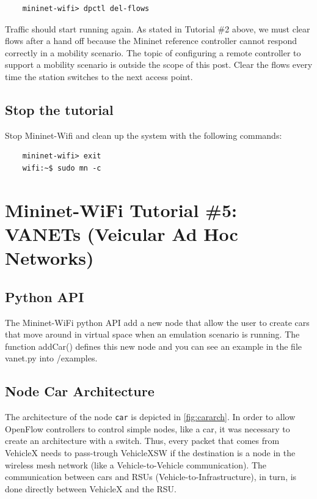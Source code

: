 \begin{verbatim}
    mininet-wifi> dpctl del-flows
\end{verbatim}
    

\noindent Traffic should start running again. As stated in Tutorial \#2 above, we must clear flows after a hand off because the Mininet reference controller cannot respond correctly in a mobility scenario. The topic of configuring a remote controller to support a mobility scenario is outside the scope of this post. Clear the flows every time the station switches to the next access point.

\subsection{Stop the tutorial}

Stop Mininet-Wifi and clean up the system with the following commands:

\begin{verbatim}
    mininet-wifi> exit
    wifi:~$ sudo mn -c
\end{verbatim}

\section{Mininet-WiFi Tutorial \#5: VANETs (Veicular Ad Hoc Networks)}

\subsection{Python API}
The Mininet-WiFi python API add a new node that allow the user to create cars that move around in virtual space when an emulation scenario is running. The function addCar() defines this new node and you can see an example in the file vanet.py into /examples.

\subsection{Node Car Architecture}

The architecture of the node \texttt{car} is depicted in \autoref{fig:cararch}. In order to allow OpenFlow controllers to control simple nodes, like a car, it was necessary to create an architecture with a switch. Thus, every packet that comes from VehicleX needs to pass-trough VehicleXSW if the destination is a node in the wireless mesh network (like a Vehicle-to-Vehicle communication). The communication between cars and RSUs (Vehicle-to-Infrastructure), in turn, is done directly between VehicleX and the RSU. 

